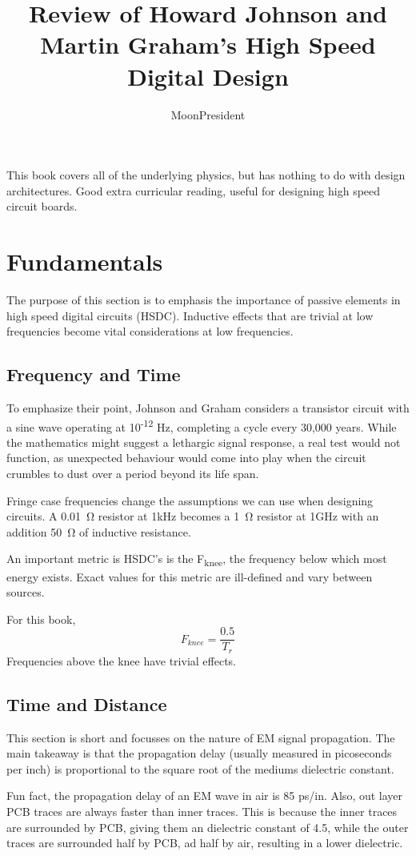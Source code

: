 \documentclass{article}
\title{Review of Howard Johnson and Martin Graham's High Speed Digital Design}
\author{MoonPresident}
\begin{document}
	\maketitle
	\tableofcontents
	
	\newpage
	This book covers all of the underlying physics, but has nothing to do with design architectures. Good extra curricular reading, useful for designing high speed circuit boards.
	
	\section{Fundamentals}
	The purpose of this section is to emphasis the importance of passive elements in high speed digital circuits (HSDC). Inductive effects that are trivial at low frequencies become vital considerations at low frequencies. 
	\subsection{Frequency and Time}
	To emphasize their point, Johnson and Graham considers a transistor circuit with a sine wave operating at 10\textsuperscript{-12} Hz, completing a cycle every 30,000 years. While the mathematics might suggest a lethargic signal response, a real test would not function, as unexpected behaviour would come into play when the circuit crumbles to dust over a period beyond its life span.
	
	Fringe case frequencies change the assumptions we can use when designing circuits. A \SI{0.01}{\ohm} resistor at 1kHz becomes a \SI{1}{\ohm} resistor at 1GHz with an addition \SI{50}{\ohm} of inductive resistance. 
	
	An important metric is HSDC's is the F\textsubscript{knee}, the frequency below which most energy exists. Exact values for this metric are ill-defined and vary between sources.
	
	For this book, $$F_{knee} = \frac{0.5}{T_{r}}$$
	Frequencies above the knee have trivial effects.
	\subsection{Time and Distance}
	This section is short and focusses on the nature of EM signal propagation. The main takeaway is that the propagation delay (usually measured in picoseconds per inch) is proportional to the square root of the mediums dielectric constant.
	
	Fun fact, the propagation delay of an EM wave in air is 85 ps/in. Also, out layer PCB traces are always faster than inner traces. This is because the inner traces are surrounded by PCB, giving them an dielectric constant of 4.5, while the outer traces are surrounded half by PCB, ad half by air, resulting in a lower dielectric.
\end{document}
